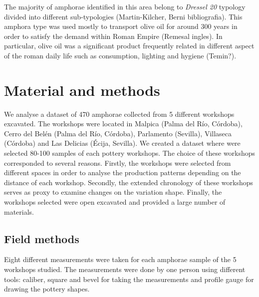 \documentclass[review]{elsarticle}
\begin{document}
The majority of amphorae identified in this area belong to \emph{Dressel 20} typology divided into different sub-typologies (Martin-Kilcher, Berni bibliografia). This amphora type was used mostly to transport olive oil for around 300 years in order to satisfy the demand within Roman Empire (Remesal ingles). In particular, olive oil was a significant product frequently related in different aspect of the roman daily life such as consumption, lighting and hygiene (Temin?).




\section{Material and methods}

We analyse a dataset of 470 amphorae collected from 5 different workshops excavated. The workshops were located in Malpica (Palma del R\'io, C\'ordoba), Cerro del Bel\'en (Palma del R\'io, C\'ordoba), Parlamento (Sevilla), Villaseca (C\'ordoba) and Las Delicias (\'Ecija, Sevilla). We created a dataset where were selected 80-100 samples of each pottery workshops. The choice of these workshops corresponded to several reasons. Firstly, the workshops were selected from different spaces in order to analyse the production patterns depending on the distance of each workshop. Secondly, the extended chronology of these workshops serves as proxy to examine changes on the variation shape. Finally, the workshops selected were open excavated and provided a large number of materials.   




\subsection{Field methods}


Eight different measurements were taken for each amphorae sample of the 5 workshops studied. The measurements were done by one person using different tools: caliber, square and bevel for taking the measurements and profile gauge for drawing the pottery shapes. 
\end{document}
